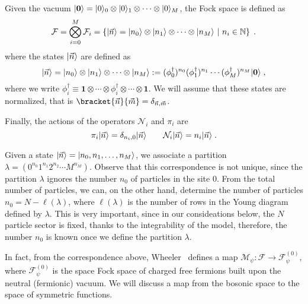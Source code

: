 \documentclass[a4paper,11pt]{amsart}
\begin{document}
Given the vacuum \(\lvert\bm{0}\rangle = \lvert0\rangle_0\otimes \lvert0\rangle_1
\otimes \cdots \otimes  \lvert0\rangle_M\),
the Fock space is defined as 
\begin{equation}
  \mathcal{F} = \bigotimes_{i=0}^M \mathcal{F}_i = 
  \left\{\lvert\vec{n}\rangle = \lvert n_0\rangle\otimes \lvert n_1\rangle \otimes \cdots
  \otimes \lvert n_M\rangle \ | \ n_i \in \mathbb{N} \right\}\; .
\end{equation}
where the states \(\lvert\vec{n}\rangle\) are defined as 
\begin{equation}
  \lvert\vec{n}\rangle = \lvert n_0\rangle\otimes \lvert n_1\rangle \otimes \cdots \otimes \lvert n_M\rangle 
 : =  (\phi_0^\dagger)^{n_0} (\phi_1^\dagger)^{n_1} \cdots  (\phi_M^\dagger)^{n_M} \lvert\bm{0}\rangle \; ,
\end{equation}
where we write \(\phi_i^\dagger \equiv \bm{1} \otimes  \cdots \otimes
\phi_i^\dagger \otimes \cdots \otimes \bm{1}\).
We will assume that these states are normalized, that is
\(\bracket{\vec{n}}{\vec{m}}=\delta_{\vec{n}, \vec{m}}\). 

Finally, the actions of the operators \(\mathcal{N}_i\) and \(\pi_i\) are
\begin{equation}
    \pi_i\lvert\vec{n}\rangle  = \delta_{n_i, 0} \lvert\vec{n}\rangle \qquad 
    \mathcal{N}_i\lvert\vec{n}\rangle = n_i \lvert\vec{n}\rangle\; .
\end{equation}
 
Given a state \(\lvert\vec{n}\rangle = \lvert n_0, n_1, \dots, n_M\rangle\), we
associate a partition \( \lambda = (0^{n_0} 1^{n_1} 2^{n_2} \cdots
M^{n_M})\). Observe that this correspondence is not unique, since the
partition \(\lambda\) ignores the number \(n_0\) of particles in the
site \(0\). From the total number of particles, we can, on the other hand,
determine the number of particles \(n_0 = N - \ell(\lambda)\), where
\(\ell(\lambda)\) is the number of rows in the Young diagram defined
by \(\lambda\). This is very important, since in our consideations 
below, the \(N\) particle sector is fixed, thanks to the integrability of 
the model, therefore, the number \(n_0\) is known once we define the 
partition \(\lambda\). 

In fact, from the correspondence above, Wheeler~\cite{Wheeler:2010vmq}
defines a map \(\mathcal{M}_\psi: \mathcal{F}\to
\mathcal{F}^{(0)}_\psi\), where \(\mathcal{F}^{(0)}_\psi\) is the
space Fock space of charged free fermions built upon the neutral
(fermionic) vacuum. We will discuss a map from the bosonic space to
the space of symmetric functions.
\end{document}
